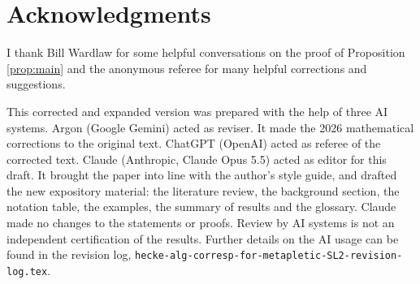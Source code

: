 \documentclass[12pt,letterpaper,reqno]{amsart}
\theoremstyle{definition}
\theoremstyle{remark}
\numberwithin{equation}{section}
\begin{document}
\section*{Acknowledgments}

I thank Bill Wardlaw for some helpful conversations on the proof of
Proposition \ref{prop:main} and the anonymous referee for many helpful
corrections and suggestions.

This corrected and expanded version was prepared with the help of three AI
systems. Argon (Google Gemini) acted as reviser. It made the 2026
mathematical corrections to the original text. ChatGPT (OpenAI) acted as
referee of the corrected text. Claude (Anthropic, Claude Opus 5.5) acted as
editor for this draft. It brought the paper into line with the author's style
guide, and drafted the new expository material: the literature review, the
background section, the notation table, the examples, the summary of results
and the glossary. Claude made no changes to the statements or proofs. Review
by AI systems is not an independent certification of the results. Further
details on the AI usage can be found in the revision log,
\texttt{hecke-alg-corresp-for-metapletic-SL2-revision-log.tex}.
\end{document}

